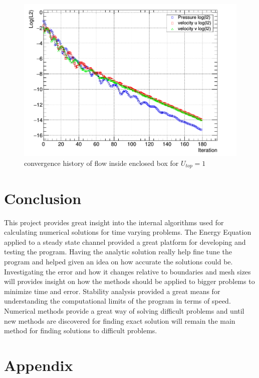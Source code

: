 \documentclass[paper=a4, fontsize=11pt, abstract=on]{scrartcl}
\numberwithin{equation}{section}		%
\numberwithin{figure}{section}			%
\numberwithin{table}{section}				%
\begin{document}
\begin{figure}[H]
\centering
\includegraphics[width=0.80\linewidth]{con3}
\caption{convergence history of flow inside enclosed box for $U_{top} = 1$ }
\label{con}
\end{figure}


\section{Conclusion}
This project provides great insight into the internal algorithms used for calculating numerical solutions for time varying problems. The Energy Equation applied to a steady state channel provided a great platform for developing and testing the program. Having the analytic solution really help fine tune the program and helped given an idea on how accurate the solutions could be. Investigating the error and how it changes relative to boundaries and mesh sizes will provides insight on how the methods should be applied to bigger problems to minimize time and error. Stability analysis provided a great means for understanding the computational limits of the program in terms of speed. Numerical methods provide a great way of solving difficult problems and until new methods are discovered for finding exact solution will remain the main method for finding solutions to difficult problems. 





\newpage
\appendix
\section{Appendix} \label{App:Appendix}
\end{document}
